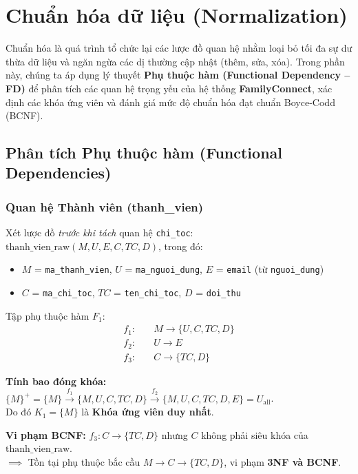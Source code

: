 \section{Chuẩn hóa dữ liệu (Normalization)}
\label{sec:2_3_chuan_hoa_du_lieu}

Chuẩn hóa là quá trình tổ chức lại các lược đồ quan hệ nhằm loại bỏ tối đa sự dư thừa dữ liệu và ngăn ngừa các dị thường cập nhật (thêm, sửa, xóa). Trong phần này, chúng ta áp dụng lý thuyết \textbf{Phụ thuộc hàm (Functional Dependency -- FD)} để phân tích các quan hệ trọng yếu của hệ thống \textbf{FamilyConnect}, xác định các khóa ứng viên và đánh giá mức độ chuẩn hóa đạt chuẩn Boyce-Codd (BCNF).

\subsection{Phân tích Phụ thuộc hàm (Functional Dependencies)}
\label{subsec:2_3_1_phu_thuoc_ham}

\subsubsection{Quan hệ Thành viên (thanh\_vien)}

\begin{example}
Xét lược đồ \emph{trước khi tách} quan hệ \texttt{chi\_toc}: \\
$\text{thanh\_vien\_raw}(M, U, E, C, TC, D)$, trong đó:
\begin{itemize}[noitemsep]
    \item $M$ = \texttt{ma\_thanh\_vien}, $U$ = \texttt{ma\_nguoi\_dung}, $E$ = \texttt{email} (từ \texttt{nguoi\_dung})
    \item $C$ = \texttt{ma\_chi\_toc}, $TC$ = \texttt{ten\_chi\_toc}, $D$ = \texttt{doi\_thu}
\end{itemize}
Tập phụ thuộc hàm $F_1$:
\begin{align*}
    f_1: & \quad M \rightarrow \{U, C, TC, D\} \\
    f_2: & \quad U \rightarrow E \\
    f_3: & \quad C \rightarrow \{TC, D\}
\end{align*}

\textbf{Tính bao đóng khóa:} $\{M\}^+ = \{M\} \xrightarrow{f_1} \{M,U,C,TC,D\} \xrightarrow{f_2} \{M,U,C,TC,D,E\} = U_{\text{all}}$. \\
Do đó $K_1 = \{M\}$ là \textbf{Khóa ứng viên duy nhất}.

\textbf{Vi phạm BCNF:} $f_3: C \rightarrow \{TC, D\}$ nhưng $C$ không phải siêu khóa của $\text{thanh\_vien\_raw}$. \\
$\implies$ Tồn tại phụ thuộc bắc cầu $M \rightarrow C \rightarrow \{TC, D\}$, vi phạm \textbf{3NF và BCNF}.
\end{example}

